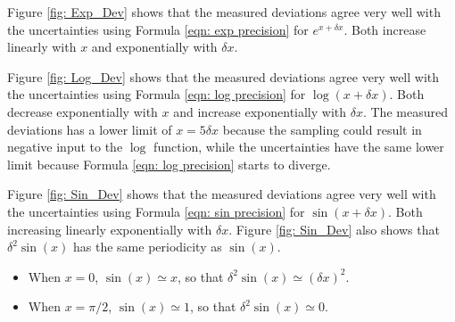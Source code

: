\documentclass[twoside]{article}
\numberwithin{equation}{section}
\begin{document}
Figure \ref{fig: Exp_Dev} shows that the measured deviations agree very well with the uncertainties using Formula \eqref{eqn: exp precision} for $e^{x + \delta x}$.
Both increase linearly with $x$ and exponentially with $\delta x$.

Figure \ref{fig: Log_Dev} shows that the measured deviations agree very well with the uncertainties using Formula \eqref{eqn: log precision} for $\log(x + \delta x)$.
Both decrease exponentially with $x$ and increase exponentially with $\delta x$.
The measured deviations has a lower limit of $x = 5 \delta x$ because the sampling could result in negative input to the $\log$ function, while the uncertainties have the same lower limit because Formula \eqref{eqn: log precision} starts to diverge.

Figure \ref{fig: Sin_Dev} shows that the measured deviations agree very well with the uncertainties using Formula \eqref{eqn: sin precision} for $\sin(x + \delta x)$.
Both increasing linearly exponentially with $\delta x$.
Figure \ref{fig: Sin_Dev} also shows that $\delta^2 \sin(x)$ has the same periodicity as $\sin(x)$.
\begin{itemize}
\item When $x=0$, $\sin(x) \simeq x$, so that $\delta^2 \sin(x) \simeq (\delta x)^2$.
\item When $x=\pi/2$, $\sin(x) \simeq 1$, so that $\delta^2 \sin(x) \simeq 0$.
\end{itemize}
\end{document}
